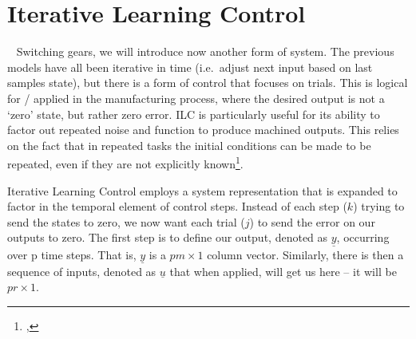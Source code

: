 \FloatBarrier\section{Iterative Learning Control} %
~\label{sec:ILC}
Switching gears, we will introduce now another form of system. The previous models have all been iterative in time (i.e.\ adjust next input based on last samples state), but there is a form of control that focuses on trials. This is logical for / applied in the manufacturing process, where the desired output is not a `zero' state, but rather zero error. \ac{ILC} is particularly useful for its ability to factor out repeated noise and function to produce machined outputs. This relies on the fact that in repeated tasks the initial conditions can be made to be repeated, even if they are not explicitly known\footnote{,}.

Iterative Learning Control employs a system representation that is expanded to factor in the temporal element of control steps. Instead of each step ($k$) trying to send the states to zero, we now want each trial ($j$) to send the error on our outputs to zero. 
The first step is to define our output, denoted as $\underline{y}$, occurring over p time steps. That is, $\underline{y}$ is a $pm\times 1$ column vector. Similarly, there is then a sequence of inputs, denoted as $\underline{u}$ that when applied, will get us here -- it will be $pr\times 1$. 

